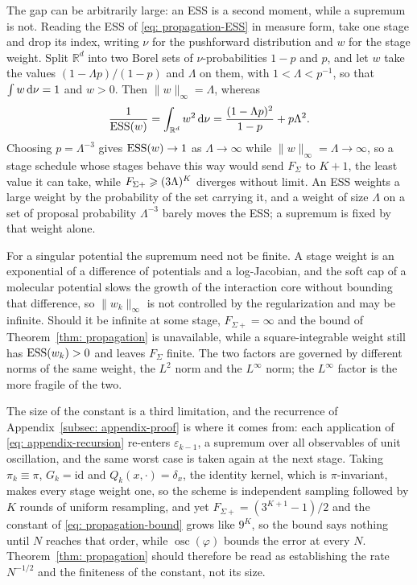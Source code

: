 \documentclass{article}
\begin{document}
The gap can be arbitrarily large: an ESS is a second moment, while a supremum is not. Reading the ESS of \eqref{eq: propagation-ESS} in measure form, take one stage and drop its index, writing $\nu$ for the pushforward distribution and $w$ for the stage weight. Split $\mathbb R^d$ into two Borel sets of $\nu$-probabilities $1-p$ and $p$, and let $w$ take the values $(1-\Lambda p)/(1-p)$ and $\Lambda$ on them, with $1<\Lambda<p^{-1}$, so that $\int w\,\mathrm{d}\nu=1$ and $w>0$. Then $\lVert w\rVert_\infty=\Lambda$, whereas
\begin{equation}
    \frac{1}{\mathrm{ESS}(w)} = \int_{\mathbb R^d} w^2\,\mathrm{d}\nu = \frac{(1-\Lambda p)^{2}}{1-p} + p\Lambda^{2} .
    \label{eq: appendix-twopoint}
\end{equation}
Choosing $p=\Lambda^{-3}$ gives $\mathrm{ESS}(w)\to1$ as $\Lambda\to\infty$ while $\lVert w\rVert_\infty=\Lambda\to\infty$, so a stage schedule whose stages behave this way would send $F_\Sigma$ to $K+1$, the least value it can take, while $F_{\Sigma+}\geqslant(3\Lambda)^{K}$ diverges without limit. An ESS weights a large weight by the probability of the set carrying it, and a weight of size $\Lambda$ on a set of proposal probability $\Lambda^{-3}$ barely moves the ESS; a supremum is fixed by that weight alone.

For a singular potential the supremum need not be finite. A stage weight is an exponential of a difference of potentials and a log-Jacobian, and the soft cap of a molecular potential slows the growth of the interaction core without bounding that difference, so $\lVert w_k\rVert_\infty$ is not controlled by the regularization and may be infinite. Should it be infinite at some stage, $F_{\Sigma+}=\infty$ and the bound of Theorem~\ref{thm: propagation} is unavailable, while a square-integrable weight still has $\mathrm{ESS}(w_k)>0$ and leaves $F_\Sigma$ finite. The two factors are governed by different norms of the same weight, the $L^2$ norm and the $L^\infty$ norm; the $L^\infty$ factor is the more fragile of the two.

The size of the constant is a third limitation, and the recurrence of Appendix~\ref{subsec: appendix-proof} is where it comes from: each application of \eqref{eq: appendix-recursion} re-enters $\varepsilon_{k-1}$, a supremum over all observables of unit oscillation, and the same worst case is taken again at the next stage. Taking $\pi_k\equiv\pi$, $G_k=\mathrm{id}$ and $Q_k(x,\cdot)=\delta_x$, the identity kernel, which is $\pi$-invariant, makes every stage weight one, so the scheme is independent sampling followed by $K$ rounds of uniform resampling, and yet $F_{\Sigma+}=(3^{K+1}-1)/2$ and the constant of \eqref{eq: propagation-bound} grows like $9^{K}$, so the bound says nothing until $N$ reaches that order, while $\operatorname{osc}(\varphi)$ bounds the error at every $N$. Theorem~\ref{thm: propagation} should therefore be read as establishing the rate $N^{-1/2}$ and the finiteness of the constant, not its size.
\end{document}
